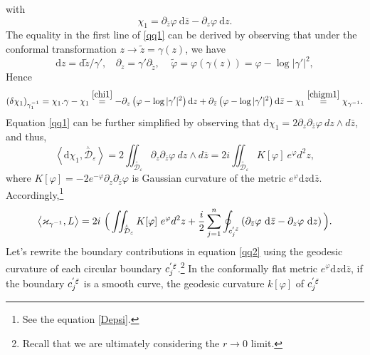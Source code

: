\documentclass[a4paper,11pt]{article}
\newcommand{\dd}{\mathrm{d}}
\newcommand{\singfund}{\overset{{}_{\curlywedge}}{\mathcal{D}}}
\newcommand{\stks}[1]{
	 \left< #1 \right>
}
\begin{document}
with
\begin{equation}
\chi_{1} = \partial_{\bar{z}}\varphi ~\dd \bar{z}-\partial_{z}\varphi~\dd z.\label{chi1}
\end{equation}
The equality in the first line of \eqref{qq1} can be derived by observing that under the conformal transformation $z\rightarrow \tilde{z} =\gamma(z)$, we have
\begin{equation}
\dd z = \dd \tilde{z}/\gamma',~~~~\partial_{z}= \gamma' \partial_{\tilde{z}},~~~~~\tilde{\varphi}=\varphi(\gamma(z)) = \varphi-\log|\gamma'|^2,\nonumber
\end{equation}
Hence
\begin{equation}
(\delta\chi_1)_{\gamma_1^{-1}} = \chi_{1}.\gamma-\chi_{1} \overset{\eqref{chi1}}{=} -\partial_{z}\left(\varphi-\log|\gamma'|^2\right) \dd z +\partial_{\bar{z}} \left(\varphi-\log|\gamma'|^2\right)\dd \bar{z}-\chi_{1} \overset{\eqref{chigm1}}{=} \chi_{\gamma^{-1}}.
\end{equation}
Equation \eqref{qq1} can be further simplified by observing that $\dd \chi_{1} = 2\partial_{z}\partial_{\bar{z}}\varphi ~dz \wedge d\bar{z}$, and thus,
\begin{equation}
\stks{\dd \chi_{1},\singfund_{\varepsilon}} = 2\iint_{\singfund_{\varepsilon}} \partial_{z}\partial_{\bar{z}}\varphi~dz \wedge d\bar{z} = 2i\iint_{\singfund_{\varepsilon}} K[\varphi] ~e^{\varphi}d^2z,
\end{equation}
where $K[\varphi] = -2 e^{-\varphi} \partial_{z}\partial_{\bar{z}}\varphi$ is Gaussian curvature of the metric $e^{\varphi}\dd z\dd{\bar{z}}$. Accordingly,\footnote{See the equation \eqref{Depsi}.}
\begin{equation}
\stks{\varkappa_{\gamma^{-1}},L}=2i~\Big(\iint_{\singfund_{\varepsilon}} K[\varphi] ~e^{\varphi}d^2z +\frac{i}{2}\sum_{j=1}^{n}\oint_{c_j^{'\hspace{.2mm}\tilde\varepsilon}}\left(\partial_{\bar{z}}\varphi ~\dd \bar{z}-\partial_{z}\varphi~\dd z\right)\Big).\label{qq2}
\end{equation}
Let's rewrite the boundary contributions in equation \eqref{qq2} using the geodesic curvature of each circular boundary $c_{j}^{'\hspace{.2mm}\tilde{\varepsilon}}$.\footnote{Recall that we are ultimately considering the  $r\rightarrow 0$ limit.} In the conformally flat metric $e^{\varphi}\dd z \dd \bar{z}$, if the boundary $c_{j}^{'\hspace{.2mm}\tilde{\varepsilon}}$ is a smooth curve, the geodesic curvature $k[\varphi]$ of $c_{j}^{'\hspace{.2mm}\tilde{\varepsilon}}$
\end{document}
